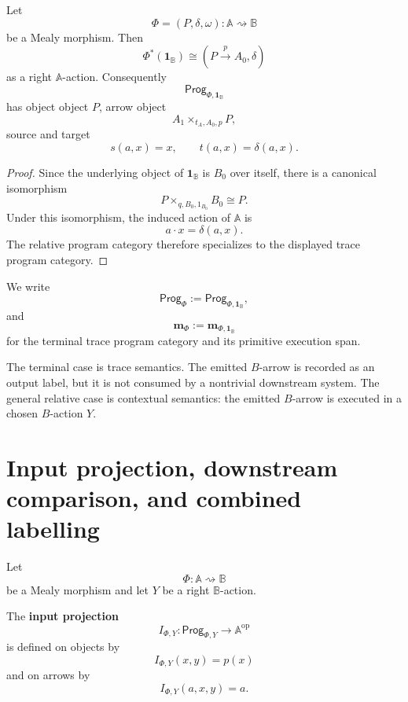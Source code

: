 \begin{corollary}
\label{cor:terminal-trace-program-category}
Let
\[
\Phi=(P,\delta,\omega):\mathbb A\rightsquigarrow\mathbb B
\]
be a Mealy morphism. Then
\[
\Phi^\ast(\mathbf 1_{\mathbb B})
\cong
(P\xrightarrow{p}A_0,\delta)
\]
as a right \(\mathbb A\)-action. Consequently
\[
\mathsf{Prog}_{\Phi,\mathbf 1_{\mathbb B}}
\]
has object object \(P\), arrow object
\[
A_1\times_{t_A,A_0,p}P,
\]
source and target
\[
s(a,x)=x,
\qquad
t(a,x)=\delta(a,x).
\]
\end{corollary}

\begin{proof}
Since the underlying object of \(\mathbf 1_{\mathbb B}\) is \(B_0\) over
itself, there is a canonical isomorphism
\[
P\times_{q,B_0,1_{B_0}}B_0\cong P.
\]
Under this isomorphism, the induced action of \(\mathbb A\) is
\[
a\cdot x=\delta(a,x).
\]
The relative program category therefore specializes to the displayed trace
program category.
\end{proof}

\begin{definition}
\label{def:trace-program-notation}
We write
\[
\mathsf{Prog}_\Phi
:=
\mathsf{Prog}_{\Phi,\mathbf 1_{\mathbb B}},
\]
and
\[
\mathbf m_\Phi
:=
\mathbf m_{\Phi,\mathbf 1_{\mathbb B}}
\]
for the terminal trace program category and its primitive execution span.
\end{definition}

\begin{remark}
\label{rem:terminal-case-trace-interpretation}
The terminal case is trace semantics. The emitted \(B\)-arrow is recorded as
an output label, but it is not consumed by a nontrivial downstream system.
The general relative case is contextual semantics: the emitted \(B\)-arrow is
executed in a chosen \(B\)-action \(Y\).
\end{remark}

\section{Input projection, downstream comparison, and combined labelling}
\label{sec:input-downstream-combined-labelling}

Let
\[
\Phi:\mathbb A\rightsquigarrow\mathbb B
\]
be a Mealy morphism and let \(Y\) be a right \(\mathbb B\)-action.

\begin{definition}
\label{def:relative-input-projection}
The \textbf{input projection}
\[
I_{\Phi,Y}:\mathsf{Prog}_{\Phi,Y}\to\mathbb A^{\mathrm{op}}
\]
is defined on objects by
\[
I_{\Phi,Y}(x,y)=p(x)
\]
and on arrows by
\[
I_{\Phi,Y}(a,x,y)=a.
\]
\end{definition}

